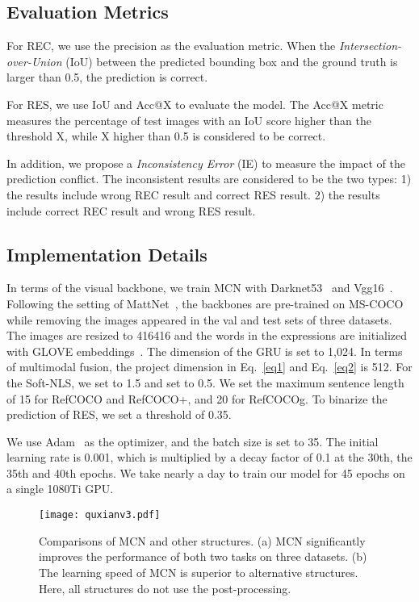 \documentclass[10pt,twocolumn,letterpaper]{article}
\begin{document}
\subsection{Evaluation Metrics}

For REC, we use the precision as the evaluation metric. When the \emph{Intersection-over-Union} (IoU) between the predicted bounding box and the ground truth is larger than 0.5, the prediction is correct. 

For RES, we use IoU and Acc@X to evaluate the model. The Acc@X metric measures the percentage of test images with an IoU score higher than the threshold X, while X higher than 0.5 is considered to be correct. 

In addition, we propose a \emph{Inconsistency Error} (IE) to measure the impact of the prediction conflict. The inconsistent results are considered to be the two types: 1) the results include wrong
REC result and correct RES result. 2) the results include
correct REC result and wrong RES result.


\subsection{Implementation Details}
In terms of the visual backbone, we train MCN with Darknet53~\cite{redmon2018yolov3:} and Vgg16~\cite{simonyan2014very}.
Following the setting of MattNet~\cite{MATT:}, the backbones are pre-trained on MS-COCO~\cite{MSCOCO} while removing the images appeared in the val and test sets of three datasets. 
The images are resized to 416416 and the words in the expressions are initialized with GLOVE embeddings~\cite{pennington2014glove}. The dimension
of the GRU is set to 1,024. In terms of multimodal fusion, the project dimension  in Eq.~\ref{eq1} and Eq.~\ref{eq2} is 512. For the Soft-NLS,  we set  to 1.5 and set  to 0.5.   We set the maximum sentence length of 15 for RefCOCO and RefCOCO+, and 20 for RefCOCOg. To binarize the prediction of RES, we set a threshold of 0.35. 

We use Adam~\cite{kingma2014adam} as the optimizer, and the batch size is set to 35. The initial learning rate is 0.001, which is multiplied by a decay factor of 0.1 at the 30th,  the 35th and 40th epochs. We take nearly a day to train our model for 45 epochs  on a single 1080Ti GPU. 
\begin{figure}[t]
	\centering
	\texttt{[image: quxianv3.pdf]}
\caption{Comparisons of MCN and other  structures. (a) MCN significantly improves the performance of both two tasks on three datasets.
		(b) The learning speed of MCN is  superior to alternative structures.
		Here, all structures do not use the post-processing.}
	\label{quxian} 
	\vspace{-1em}
\end{figure}
\end{document}
